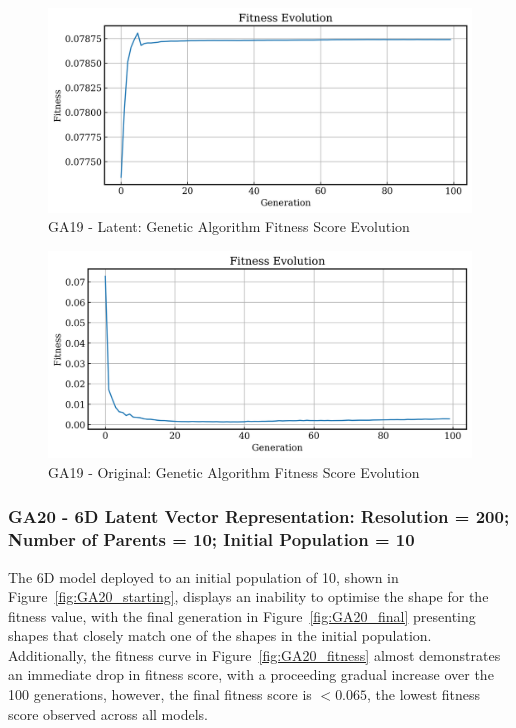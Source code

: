 \documentclass{article}
\begin{document}
\begin{figure}[H]
    \centering
    \includegraphics[width=0.75\linewidth]{figures/GAResults/GA19/latent/100gen_fitness.png}
    \caption{GA19 - Latent: Genetic Algorithm Fitness Score Evolution}
    \label{fig:GA19_latent_fitness}
\end{figure}
\begin{figure}[H]
    \centering
    \includegraphics[width=0.75\linewidth]{figures/GAResults/GA19/original/original_fitness.png}
    \caption{GA19 - Original: Genetic Algorithm Fitness Score Evolution}
    \label{fig:GA19_original_fitness}
\end{figure}

\subsubsection*{GA20 - 6D Latent Vector Representation: Resolution = 200; Number of Parents = 10; Initial Population = 10}
The 6D model deployed to an initial population of 10, shown in Figure~\ref{fig:GA20_starting}, displays an inability to optimise the shape for the fitness value, with the final generation in Figure~\ref{fig:GA20_final} presenting shapes that closely match one of the shapes in the initial population. Additionally, the fitness curve in Figure~\ref{fig:GA20_fitness} almost demonstrates an immediate drop in fitness score, with a proceeding gradual increase over the 100 generations, however, the final fitness score is $< 0.065$, the lowest fitness score observed across all models.
\end{document}
